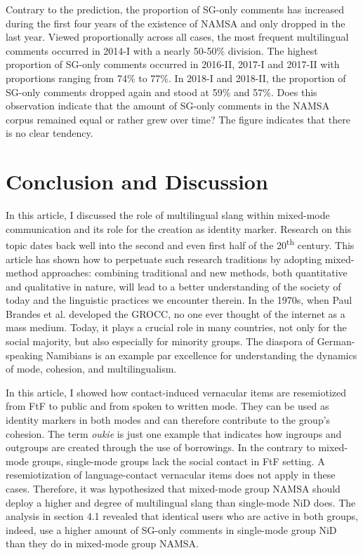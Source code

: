 \documentclass[output=paper]{langsci/langscibook}
\begin{document}
Contrary to the prediction, the proportion of SG-only comments has increased during the first four years of the existence of NAMSA and only dropped in the last year. Viewed proportionally across all cases, the most frequent multilingual comments occurred in 2014-I with a nearly 50-50\% division. The highest proportion of SG-only comments occurred in 2016-II, 2017-I and 2017-II with proportions ranging from 74\% to 77\%. In 2018-I and 2018-II, the proportion of SG-only comments dropped again and stood at 59\% and 57\%. Does this observation indicate that the amount of SG-only comments in the NAMSA corpus remained equal or rather grew over time? The figure indicates that there is no clear tendency.

 
\section{Conclusion and Discussion}
 \label{sec:radke:5}

In this article, I discussed the role of multilingual slang within mixed-mode communication and its role for the creation as identity marker.  Research on this topic dates back well into the second and even first half of the 20\textsuperscript{th} century. This article has shown how to perpetuate such research traditions by adopting mixed-method approaches: combining traditional and new methods, both quantitative and qualitative in nature, will lead to a better understanding of the society of today and the linguistic practices we encounter therein. In the 1970s, when Paul Brandes et al. developed the GROCC, no one ever thought of the internet as a mass medium. Today, it plays a crucial role in many countries, not only for the social majority, but also especially for minority groups. The diaspora of German-speaking Namibians is an example par excellence for understanding the dynamics of mode, cohesion, and multilingualism. 

In this article, I showed how contact-induced vernacular items are resemiotized from FtF to public and from spoken to written mode. They can be used as identity markers in both modes and can therefore contribute to the group’s cohesion. The term \textit{oukie} is just one example that indicates how ingroups and outgroups are created through the use of borrowings. In the contrary to mixed-mode groups, single-mode groups lack the social contact in FtF setting. A resemiotization of language-contact vernacular items does not apply in these cases. Therefore, it was hypothesized that mixed-mode group NAMSA should deploy a higher and degree of multilingual slang than single-mode NiD does. The analysis in section 4.1 revealed that identical users who are active in both groups, indeed, use a higher amount of SG-only comments in single-mode group NiD than they do in mixed-mode group NAMSA.
\end{document}

